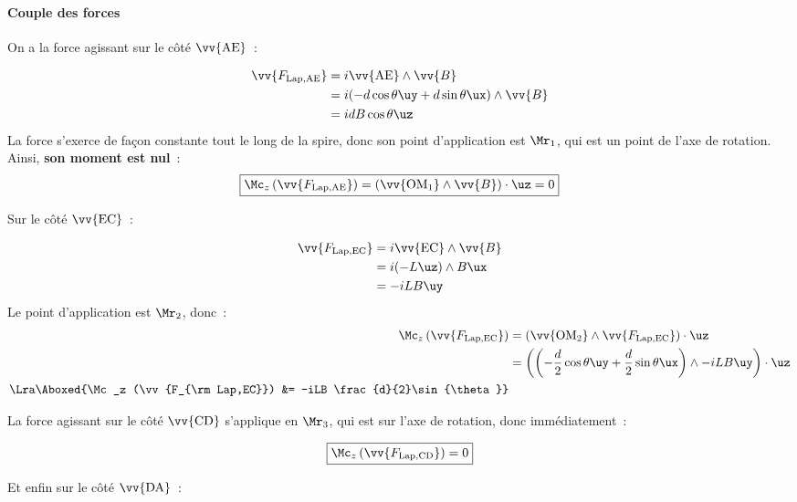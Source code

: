 \documentclass[../main/main.tex]{subfiles}
\begin{document}
\paragraph*{Couple des forces} On a la force agissant sur le côté $\vv{\rm
AE}$~:
\begin{hide}
  \begin{align*}
    \vv{F_{\rm Lap,AE}}
      &= i \vv{\rm AE}\wedge \vv{B}
      \\
      &= i (-d \cos{\theta}\uy + d\sin{\theta}\ux)\wedge \vv{B}
      \\
      &= idB\cos{\theta}\uz
  \end{align*}
  La force s'exerce de façon constante tout le long de la spire, donc son point
  d'application est $\Mr_1$, qui est un point de l'axe de rotation. Ainsi,
  \textbf{son moment est nul}~:
  \[
    \boxed{\Mc_z \left( \vv{F_{\rm Lap,AE}} \right) =
    \left( \vv{\rm OM_1}\wedge \vv{B} \right)\cdot \uz
  = 0}
  \]
\end{hide}
\noindent
Sur le côté $\vv{\rm EC}$~:
\begin{hide}
  \begin{align*}
    \vv{F_{\rm Lap,EC}}
      &= i \vv{\rm EC}\wedge \vv{B}
    \\
      &= i (-L\uz)\wedge B\ux
    \\
      &= -iLB\uy
  \end{align*}
  Le point d'application est $\Mr_2$, donc~:
  \begin{align*}
    \Mc_z \left(\vv{F_{\rm Lap,EC}}\right)
      &= \left(\vv{\rm OM_2}\wedge \vv{F_{\rm Lap,EC}}\right)\cdot \uz
    \\
      &= \left(
        \left( 
          -\frac{d}{2}\cos{\theta}\uy +
          \frac{d}{2}\sin{\theta}\ux
        \right)\wedge -iLB\uy
      \right)\cdot \uz
    \\\Lra 
    \Aboxed{\Mc_z (\vv{F_{\rm Lap,EC}})
        &= -iLB \frac{d}{2}\sin{\theta}}
  \end{align*}
\end{hide}
\noindent
La force agissant sur le côté $\vv{\rm CD}$ s'applique en $\Mr_3$, qui est sur
l'axe de rotation, donc immédiatement~:
\begin{hide}
  \[
    \boxed{\Mc_z \left( \vv{F_{\rm Lap,CD}} \right) = 0}
  \]
\end{hide}
\noindent
Et enfin sur le côté $\vv{\rm DA}$~:
\end{document}
